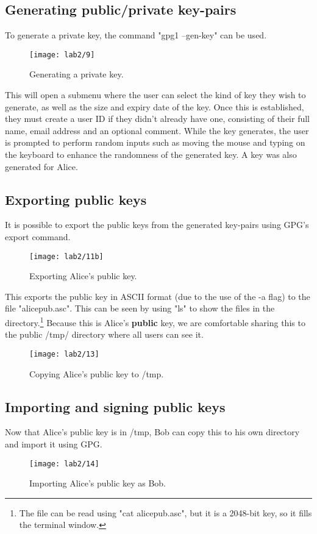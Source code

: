 \subsection{Generating public/private key-pairs}\label{subsec:generating-private-keys}

To generate a private key, the command "gpg1 --gen-key" can be used.

\begin{figure}[H]
    \centering
    \texttt{[image: lab2/9]}
    \caption{Generating a private key.}
    \label{fig:GPGgen}
\end{figure}

This will open a submenu where the user can select the kind of key they wish to generate,
as well as the size and expiry date of the key.
Once this is established, they must create a user ID if they didn't already have one,
consisting of their full name, email address and an optional comment.
While the key generates, the user is prompted to perform random inputs such as moving the mouse
and typing on the keyboard to enhance the randomness of the generated key.
A key was also generated for Alice.

\subsection{Exporting public keys}\label{subsec:exporting-public-keys}
It is possible to export the public keys from the generated key-pairs using GPG's export command.

\begin{figure}[H]
    \centering
    \texttt{[image: lab2/11b]}
    \caption{Exporting Alice's public key.}
    \label{fig:GPGexport}
\end{figure}

\noindent This exports the public key in ASCII format (due to the use of the -a flag) to the file "alicepub.asc".
This can be seen by using "ls" to show the files in the directory.\footnote{The file can be read using "cat alicepub.asc", but it is a 2048-bit key, so it fills the terminal window.}
Because this is Alice's \textbf{public} key, we are comfortable sharing this to the public /tmp/ directory where all
users can see it.

\begin{figure}[H]
    \centering
    \texttt{[image: lab2/13]}
    \caption{Copying Alice's public key to /tmp.}
    \label{fig:alicePubTmp}
\end{figure}


\subsection{Importing and signing public keys}\label{subsec:importing-public-keys}
Now that Alice's public key is in /tmp, Bob can copy this to his own directory and import it using GPG\@.

\begin{figure}[H]
    \centering
    \texttt{[image: lab2/14]}
    \caption{Importing Alice's public key as Bob.}
    \label{fig:importAlice}
\end{figure}


